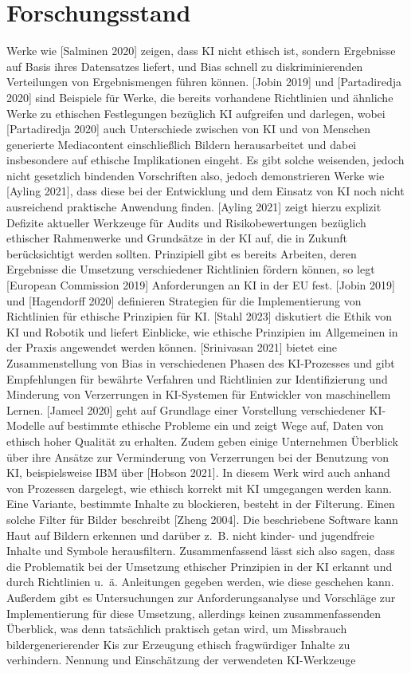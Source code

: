 \documentclass[12pt]{article}
\begin{document}
\section{Forschungsstand}
Werke wie [Salminen 2020] zeigen, dass KI nicht ethisch ist, sondern Ergebnisse auf Basis ihres Datensatzes liefert, und Bias schnell zu diskriminierenden Verteilungen von Ergebnismengen führen können. [Jobin 2019] und [Partadiredja 2020] sind Beispiele für Werke, die bereits vorhandene Richtlinien und ähnliche Werke zu ethischen Festlegungen bezüglich KI aufgreifen und darlegen, wobei [Partadiredja 2020] auch Unterschiede zwischen von KI und von Menschen generierte Mediacontent einschließlich Bildern herausarbeitet und dabei insbesondere auf ethische Implikationen eingeht. Es gibt solche weisenden, jedoch nicht gesetzlich bindenden Vorschriften also, jedoch demonstrieren Werke wie [Ayling 2021], dass diese bei der Entwicklung und dem Einsatz von KI noch nicht ausreichend praktische Anwendung finden. [Ayling 2021] zeigt hierzu explizit Defizite aktueller Werkzeuge für Audits und Risikobewertungen bezüglich ethischer Rahmenwerke und Grundsätze in der KI auf, die in Zukunft berücksichtigt werden sollten. 
Prinzipiell gibt es bereits Arbeiten, deren Ergebnisse die Umsetzung verschiedener Richtlinien fördern können, so legt [European Commission 2019] Anforderungen an KI in der EU fest. [Jobin 2019] und [Hagendorff 2020] definieren Strategien für die Implementierung von Richtlinien für ethische Prinzipien für KI. [Stahl 2023] diskutiert die Ethik von KI und Robotik und liefert Einblicke, wie ethische Prinzipien im Allgemeinen in der Praxis angewendet werden können. [Srinivasan 2021] bietet eine Zusammenstellung von Bias in verschiedenen Phasen des KI-Prozesses und gibt Empfehlungen für bewährte Verfahren und Richtlinien zur Identifizierung und Minderung von Verzerrungen in KI-Systemen für Entwickler von maschinellem Lernen. [Jameel 2020] geht auf Grundlage einer Vorstellung verschiedener KI-Modelle auf bestimmte ethische Probleme ein und zeigt Wege auf, Daten von ethisch hoher Qualität zu erhalten.
Zudem geben einige Unternehmen Überblick über ihre Ansätze zur Verminderung von Verzerrungen bei der Benutzung von KI, beispielsweise IBM über [Hobson 2021]. In diesem Werk wird auch anhand von Prozessen dargelegt, wie ethisch korrekt mit KI umgegangen werden kann.
Eine Variante, bestimmte Inhalte zu blockieren, besteht in der Filterung. Einen solche Filter für Bilder beschreibt [Zheng 2004]. Die beschriebene Software kann Haut auf Bildern erkennen und darüber z. B. nicht kinder- und jugendfreie Inhalte und Symbole herausfiltern.
Zusammenfassend lässt sich also sagen, dass die Problematik bei der Umsetzung ethischer Prinzipien in der KI erkannt und durch Richtlinien u. ä. Anleitungen gegeben werden, wie diese geschehen kann. Außerdem gibt es Untersuchungen zur Anforderungsanalyse und Vorschläge zur Implementierung für diese Umsetzung, allerdings keinen zusammenfassenden Überblick, was denn tatsächlich praktisch getan wird, um Missbrauch bildergenerierender Kis zur Erzeugung ethisch fragwürdiger Inhalte zu verhindern.
Nennung und Einschätzung der verwendeten KI-Werkzeuge
\end{document}
